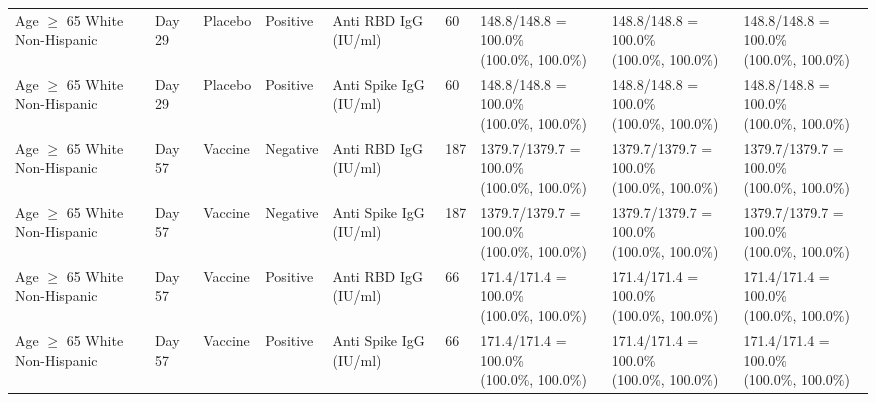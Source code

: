 \documentclass[]{book}
\theoremstyle{definition}
\theoremstyle{definition}
\theoremstyle{definition}
\newcommand{\1}{\mathbbm{1}}
\begin{document}
\begin{landscape}
\begin{ThreePartTable}
\begin{longtable}[t]{>{\raggedright\arraybackslash}p{2.7cm}llllllll}
\hspace{1em}Age $\geq$ 65 White Non-Hispanic & Day 29 & Placebo & Positive & Anti RBD IgG (IU/ml) & 60 & \makecell[l]{148.8/148.8 = 100.0\%\\(100.0\%, 100.0\%)} & \makecell[l]{148.8/148.8 = 100.0\%\\(100.0\%, 100.0\%)} & \makecell[l]{148.8/148.8 = 100.0\%\\(100.0\%, 100.0\%)}\\
\hspace{1em}Age $\geq$ 65 White Non-Hispanic & Day 29 & Placebo & Positive & Anti Spike IgG (IU/ml) & 60 & \makecell[l]{148.8/148.8 = 100.0\%\\(100.0\%, 100.0\%)} & \makecell[l]{148.8/148.8 = 100.0\%\\(100.0\%, 100.0\%)} & \makecell[l]{148.8/148.8 = 100.0\%\\(100.0\%, 100.0\%)}\\
\hspace{1em}Age $\geq$ 65 White Non-Hispanic & Day 57 & Vaccine & Negative & Anti RBD IgG (IU/ml) & 187 & \makecell[l]{1379.7/1379.7 = 100.0\%\\(100.0\%, 100.0\%)} & \makecell[l]{1379.7/1379.7 = 100.0\%\\(100.0\%, 100.0\%)} & \makecell[l]{1379.7/1379.7 = 100.0\%\\(100.0\%, 100.0\%)}\\
\hspace{1em}Age $\geq$ 65 White Non-Hispanic & Day 57 & Vaccine & Negative & Anti Spike IgG (IU/ml) & 187 & \makecell[l]{1379.7/1379.7 = 100.0\%\\(100.0\%, 100.0\%)} & \makecell[l]{1379.7/1379.7 = 100.0\%\\(100.0\%, 100.0\%)} & \makecell[l]{1379.7/1379.7 = 100.0\%\\(100.0\%, 100.0\%)}\\
\hspace{1em}Age $\geq$ 65 White Non-Hispanic & Day 57 & Vaccine & Positive & Anti RBD IgG (IU/ml) & 66 & \makecell[l]{171.4/171.4 = 100.0\%\\(100.0\%, 100.0\%)} & \makecell[l]{171.4/171.4 = 100.0\%\\(100.0\%, 100.0\%)} & \makecell[l]{171.4/171.4 = 100.0\%\\(100.0\%, 100.0\%)}\\
\hspace{1em}Age $\geq$ 65 White Non-Hispanic & Day 57 & Vaccine & Positive & Anti Spike IgG (IU/ml) & 66 & \makecell[l]{171.4/171.4 = 100.0\%\\(100.0\%, 100.0\%)} & \makecell[l]{171.4/171.4 = 100.0\%\\(100.0\%, 100.0\%)} & \makecell[l]{171.4/171.4 = 100.0\%\\(100.0\%, 100.0\%)}\\

\end{longtable}
\end{ThreePartTable}
\end{landscape}
\end{document}
